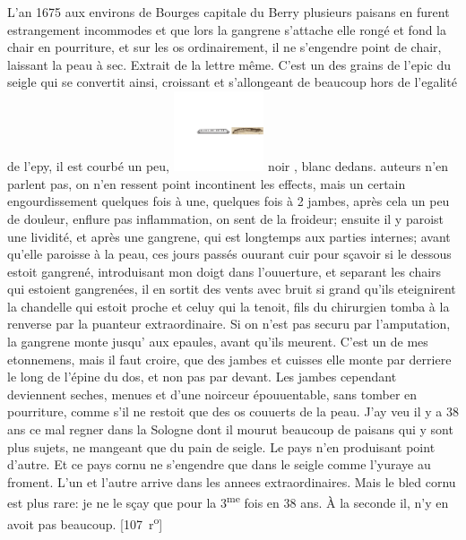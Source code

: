 L'an 1675 aux environs de Bourges\protect{} capitale du Berry\protect{} plusieurs paisans en furent estrangement incommodes et que lors la gangrene\protect{} s'attache elle rong\'{e} et fond la chair en pourriture, et sur les os ordinairement, il ne s'engendre point de chair, laissant la peau  \`{a} sec. Extrait de la lettre m\^{e}me. C'est un des grains de l'epic du seigle qui se convertit ainsi, croissant et s'allongeant de beaucoup hors de l'egalit\'{e} de l'epy, il est courb\'{e} un peu, \includegraphics[width=0.2\textwidth]{images/lh0351402_106v-d1.pdf} noir , blanc dedans.  auteurs n'en parlent pas, on n'en ressent point incontinent les effects, mais un certain engourdissement quelques fois \`{a} une, quelques fois \`{a} 2 jambes, après cela un peu de douleur, enflure pas inflammation, on sent de la froideur; ensuite il y paroist une lividit\'{e}, et après une gangrene\protect{}, qui est longtemps aux parties internes; avant qu'elle paroisse \`{a} la peau, ces jours pass\'{e}s ouurant  cuir pour s\c{c}avoir si le dessous estoit gangren\'{e}, introduisant mon doigt dans l'ouuerture, et separant les chairs qui estoient gangren\'{e}es, il en sortit des vents avec bruit si grand qu'ils eteignirent la chandelle qui estoit proche et celuy qui la tenoit, fils du chirurgien tomba \`{a} la renverse par la puanteur extraordinaire. Si on n'est pas securu par l'amputation\protect{}, la gangrene\protect{} monte jusqu' aux epaules, avant qu'ils meurent. C'est un de mes etonnemens, mais il faut croire, que des jambes et cuisses elle monte par derriere le long de l'\'{e}pine du dos, et non pas par devant. Les jambes cependant deviennent seches, menues et d'une noirceur \'{e}pouuentable, sans tomber en pourriture, comme s'il ne restoit que des os couuerts de la peau. J'ay veu il y a 38 ans ce mal regner dans la Sologne\protect{} dont il mourut beaucoup de paisans qui y sont plus sujets, ne mangeant que du pain de seigle. Le pays n'en produisant point d'autre. Et ce pays cornu ne s'engendre que dans le seigle comme l'yuraye au froment. L'un et l'autre arrive dans les annees extraordinaires. Mais le bled cornu est plus rare: je ne le s\c{c}ay que pour la 3\textsuperscript{me} fois en 38 ans.
\`{A} la seconde il, n'y en avoit pas beaucoup.
[107~r\textsuperscript{o}]
\pend
\count{}
\count{}
\count{}